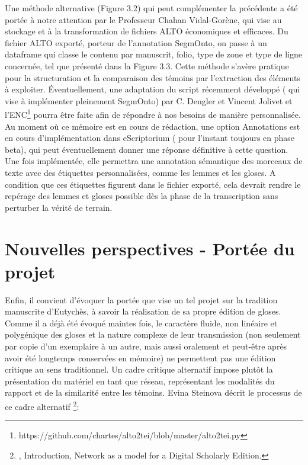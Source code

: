 \documentclass[a4paper, twoside, 12pt]{book}
\begin{document}
Une méthode alternative (Figure 3.2) qui peut complémenter la précédente a été portée à notre attention par le Professeur Chahan Vidal-Gorène, qui vise au stockage et à la transformation de fichiers ALTO économiques et efficaces. Du fichier ALTO exporté, porteur de l'annotation SegmOnto, on passe à un dataframe qui classe le contenu par manuscrit, folio, type de zone et type de ligne concernée, tel que présenté dans la Figure 3.3. Cette méthode s'avère pratique pour la structuration et la comparaison des témoins par l'extraction des éléments à exploiter. Éventuellement, une adaptation du script récemment  développé ( qui vise à implémenter pleinement SegmOnto) par C. Dengler et Vincent Jolivet et l'ENC\footnote{ https://github.com/chartes/alto2tei/blob/master/alto2tei.py} pourra être faite afin de répondre à nos besoins de manière personnalisée. \\

Au moment où ce mémoire est en cours de rédaction, une option \og{} Annotations \fg{} est en cours d'implémentation dans eScriptorium ( pour l'instant toujours en phase beta), qui peut éventuellement donner une réponse définitive à cette question. Une fois implémentée, elle permettra une annotation sémantique des morceaux de texte avec des étiquettes personnalisées, comme les lemmes et les gloses. A condition que ces étiquettes figurent dans le fichier exporté, cela devrait rendre le repérage des lemmes et gloses possible dès la phase de la transcription sans perturber la vérité de terrain.


\section{Nouvelles perspectives - Portée du projet}

Enfin, il convient d'évoquer la portée que vise un tel projet sur la tradition manuscrite d'Eutychès, à savoir la réalisation de sa propre édition de gloses.
Comme il a déjà été évoqué maintes fois, le caractère fluide, non linéaire et polygénique des gloses et la nature complexe de leur transmission (non seulement par copie d'un exemplaire à un autre, mais aussi oralement et peut-être après avoir été longtemps conservées en mémoire) ne permettent pas une édition critique au sens traditionnel. Un cadre critique alternatif impose plutôt la présentation du matériel en tant que réseau, représentant les modalités du rapport et de la similarité entre les témoins. Evina Steinova décrit le processus de ce cadre alternatif \footnote{\cite{steinova2021glosses}, Introduction, Network as a model for a Digital Scholarly Edition.}:
\end{document}
